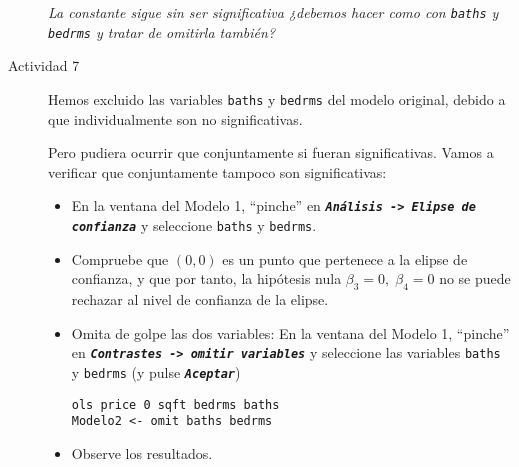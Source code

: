 \documentclass[11pt]{article}
\begin{document}
\begin{description}
\emph{La constante sigue sin ser significativa ¿debemos hacer como con
\texttt{baths} y \texttt{bedrms} y tratar de omitirla también?}

\item[{Actividad 7}] Hemos excluido las variables \texttt{baths} y \texttt{bedrms} del
modelo original, debido a que individualmente son no significativas.

Pero pudiera ocurrir que conjuntamente si fueran
significativas. Vamos a verificar que conjuntamente tampoco son
significativas:

\begin{itemize}
\item En la ventana del Modelo 1, ``pinche'' en \textbf{\emph{\texttt{Análisis -> Elipse de
    confianza}}} y seleccione \texttt{baths} y \texttt{bedrms}.

\item Compruebe que \((0,0)\) es un punto que pertenece a la elipse de
confianza, y que por tanto, la hipótesis nula \(\beta_3=0,\;
    \beta_4=0\) no se puede rechazar al nivel de confianza de la
elipse.

\item Omita de golpe las dos variables: En la ventana del Modelo 1,
``pinche'' en \textbf{\emph{\texttt{Contrastes -> omitir variables}}} y seleccione
las variables \texttt{baths} y \texttt{bedrms} (y pulse \textbf{\emph{\texttt{Aceptar}}})
\begin{verbatim}
ols price 0 sqft bedrms baths
Modelo2 <- omit baths bedrms
\end{verbatim}

\item Observe los resultados.
\end{itemize}
\end{description}
\end{document}
